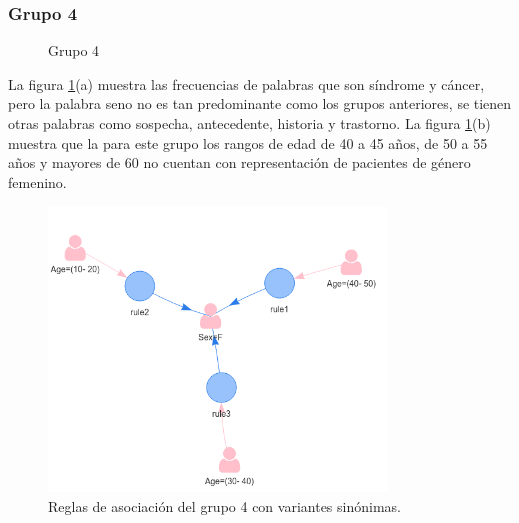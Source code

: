 \subsubsection*{Grupo 4}
\begin{figure}[H]
	\centering
	\caption{Grupo 4} \label{fig:c4}
\end{figure}

La figura \ref{fig:c4}(a) muestra las frecuencias de palabras que son síndrome y cáncer, pero la palabra seno no es tan predominante como los grupos anteriores, se tienen otras palabras como sospecha, antecedente, historia y trastorno. La figura \ref{fig:c4}(b) muestra que la para este grupo los rangos de edad de 40 a 45 años, de 50 a 55 años y mayores de 60 no cuentan con representación de pacientes de género femenino.

\begin{figure}[H]
	\centering
	\includegraphics[width=0.8\textwidth]{Kap4/reglas4_1}
	\caption{Reglas de asociación del grupo 4 con variantes sinónimas.} \label{fig:r4}
\end{figure}

